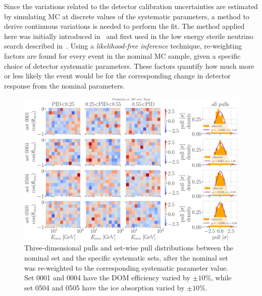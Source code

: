 Since the variations related to the detector calibration uncertainties are estimated by simulating MC at discrete values of the systematic parameters, a method to derive continuous variations is needed to perform the fit. The method applied here was initially introduced in~ and first used in the low energy sterile neutrino search described in~. Using a \textit{likelihood-free inference} technique, re-weighting factors are found for every event in the nominal MC sample, given a specific choice of detector systematic parameters. These factors quantify how much more or less likely the event would be for the corresponding change in detector response from the nominal parameters.

\begin{figure}[h]
    \includegraphics[width=0.9\linewidth]{figures/results/utlrasurfaces/oscNext_leptoninjector_1.0_GeV_knn_probs_neighbors_500_weighted_nfiles_extended_holeice_corrected_grads_poly_2_weighted_reference_weight_0.0100_thesis_style_subset_0-5.png}
    \caption[Detector systematic uncertainty treatment bin-wise pulls example sets]{Three-dimensional pulls and set-wise pull distributions between the nominal set and the specific systematic sets, after the nominal set was re-weighted to the corresponding systematic parameter value. Set 0001 and 0004 have the DOM efficiency varied by $\pm10\%$, while set 0504 and 0505 have the ice absorption varied by $\pm10\%$.}
\end{figure}

